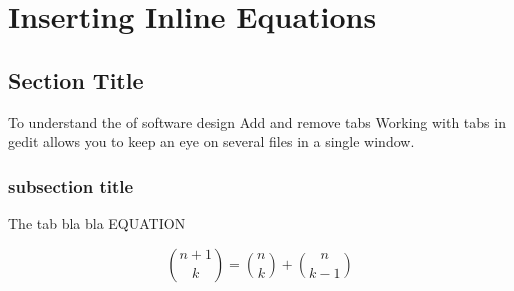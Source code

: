 \chapter{Inserting Inline Equations} 
\label{AppendixE} 


\section{Section Title}
To understand the  of software design Add and remove tabs Working with tabs in gedit allows you to keep an eye on several files in a single window. 

\subsection{subsection title}
The tab bla bla EQUATION

\begin{equation}
\binom{n+1}{k} = \binom{n}{k} + \binom{n}{k-1}
\end{equation}



